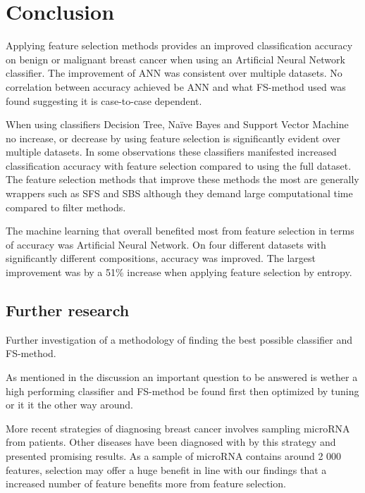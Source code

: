 \chapter{Conclusion}




Applying feature selection methods provides an improved classification accuracy on benign or malignant breast cancer when using an Artificial Neural Network classifier. The improvement of ANN was consistent over multiple datasets. No correlation between accuracy achieved be ANN and what FS-method used was found suggesting it is case-to-case dependent.

When using classifiers Decision Tree, Na\"ive Bayes and Support Vector Machine no increase, or decrease by using feature selection is significantly evident over multiple datasets. In some observations these classifiers manifested increased classification accuracy with feature selection compared to using the full dataset. The feature selection methods that improve these methods the most are generally wrappers such as SFS and SBS although they demand large computational time compared to filter methods.


The machine learning that overall benefited most from feature selection in terms of accuracy was Artificial Neural Network. On four different datasets with significantly different compositions, accuracy was improved. The largest improvement was by a 51\% increase when applying feature selection by entropy.


\section{Further research}

Further investigation of a methodology of finding the best possible classifier and FS-method.

As mentioned in the discussion an important question to be answered is wether a high performing classifier and FS-method be found first then optimized by tuning or it it the other way around.

More recent strategies of diagnosing breast cancer involves sampling microRNA from patients. Other diseases have been diagnosed with by this strategy and presented promising results. As a sample of microRNA contains around 2 000 features, selection may offer a huge benefit in line with our findings that a increased number of feature benefits more from feature selection.
